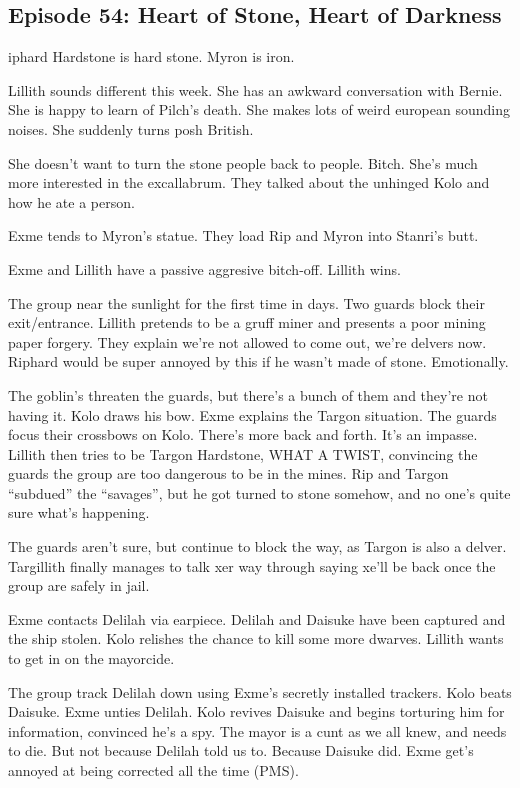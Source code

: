 \subsection{Episode 54: Heart of Stone, Heart of Darkness}

iphard Hardstone is hard stone. Myron is iron.\medskip

Lillith sounds different this week. She has an awkward conversation with Bernie. She is happy to learn of Pilch’s death. She makes lots of weird european sounding noises. She suddenly turns posh British.\medskip

She doesn’t want to turn the stone people back to people. Bitch. She’s much more interested in the excallabrum. They talked about the unhinged Kolo and how he ate a person.\medskip

Exme tends to Myron’s statue. They load Rip and Myron into Stanri’s butt.\medskip

Exme and Lillith have a passive aggresive bitch-off. Lillith wins.\medskip

The group near the sunlight for the first time in days. Two guards block their exit/entrance. Lillith pretends to be a gruff miner and presents a poor mining paper forgery. They explain we’re not allowed to come out, we’re delvers now. Riphard would be super annoyed by this if he wasn’t made of stone. Emotionally.\medskip

The goblin’s threaten the guards, but there’s a bunch of them and they’re not having it. Kolo draws his bow. Exme explains the Targon situation. The guards focus their crossbows on Kolo. There’s more back and forth. It’s an impasse. Lillith then tries to be Targon Hardstone, WHAT A TWIST, convincing the guards the group are too dangerous to be in the mines. Rip and Targon “subdued” the “savages”, but he got turned to stone somehow, and no one’s quite sure what’s happening.\medskip

The guards aren’t sure, but continue to block the way, as Targon is also a delver. Targillith finally manages to talk xer way through saying xe’ll be back once the group are safely in jail.\medskip

Exme contacts Delilah via earpiece. Delilah and Daisuke have been captured and the ship stolen. Kolo relishes the chance to kill some more dwarves. Lillith wants to get in on the mayorcide.\medskip

The group track Delilah down using Exme’s secretly installed trackers. Kolo beats Daisuke. Exme unties Delilah. Kolo revives Daisuke and begins torturing him for information, convinced he’s a spy. The mayor is a cunt as we all knew, and needs to die. But not because Delilah told us to. Because Daisuke did. Exme get’s annoyed at being corrected all the time (PMS).\medskip

